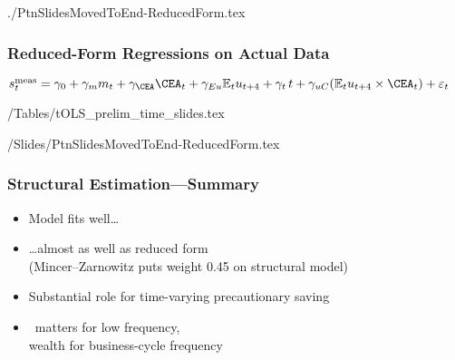 \documentclass[pdflatex]{beamer}
\newcommand{\jemph}[1]{{\color{jirkasred}#1}}
\begin{document}
{\begin{verbatimwrite}{./PtnSlidesMovedToEnd-ReducedForm.tex}
\begin{frame}
                                             \end{frame}


                                             \begin{frame}
                                               \frametitle{\textbf{Reduced-Form Regressions on Actual Data}}

                                               {\small\jemph{$s_t^{\text{meas}}=\gamma_0+\gamma_m m_t +\gamma_{\CEA} \CEA_t+\gamma_{Eu}\Ex_t u_{t+4}+\gamma_t\,t+\gamma_{uC} (\Ex_t u_{t+4}\times\CEA_t)+\varepsilon_t $}}

                                                \econtexRoot/Tables/tOLS_prelim_time_slides.tex

                                             \end{frame}


                                           \end{verbatimwrite}


                                            \econtexRoot/Slides/PtnSlidesMovedToEnd-ReducedForm.tex

                                           \begin{frame}
                                             \frametitle{\textbf{Structural Estimation---Summary}}

                                             \begin{itemize}
                                             \item Model fits well\dots
                                             \item \dots almost as well as reduced form\\ (Mincer--Zarnowitz puts weight 0.45 on structural model)
                                             \item Substantial role for \jemph{time-varying precautionary saving}
                                             \item \CEA\ matters for low frequency,\\ wealth for business-cycle frequency
                                             \end{itemize}

                                           \end{frame}

                                         }
\end{document}
